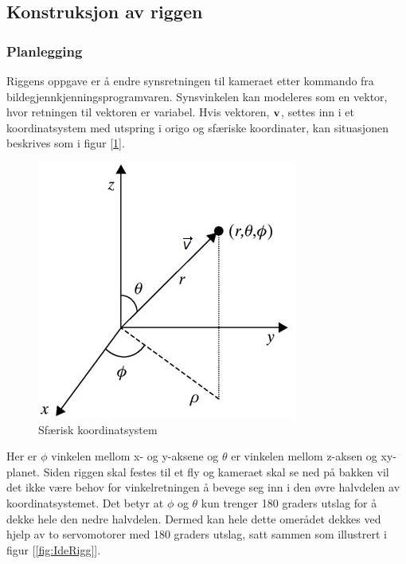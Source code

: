 \subsection{Konstruksjon av riggen}

\subsubsection{Planlegging}
Riggens oppgave er å endre synsretningen til kameraet etter kommando fra bildegjennkjenningsprogramvaren. Synsvinkelen kan modeleres som en vektor, hvor retningen til vektoren er variabel. Hvis vektoren, $\bf{v}$, settes inn i et koordinatsystem med utspring i origo og sfæriske koordinater, kan situasjonen beskrives som i figur [\ref{fig:spher}].

\begin{figure}[h!]
	\centering
	\includegraphics[scale=0.5]{img/RettVek.jpg}
	\caption{Sfærisk koordinatsystem}
	\label{fig:spher}
\end{figure}

Her er $\phi$ vinkelen mellom x- og y-aksene og $\theta$ er vinkelen mellom z-aksen og xy-planet. Siden riggen skal festes til et fly og kameraet skal se ned på bakken vil det ikke være behov for vinkelretningen å bevege seg inn i den øvre halvdelen av koordinatsystemet. Det betyr at $\phi$ og $\theta$ kun trenger 180 graders utslag for å dekke hele den nedre halvdelen. Dermed kan hele dette omerådet dekkes ved hjelp av to servomotorer med 180 graders utslag, satt sammen som illustrert i figur [\ref{fig:IdeRigg}].

